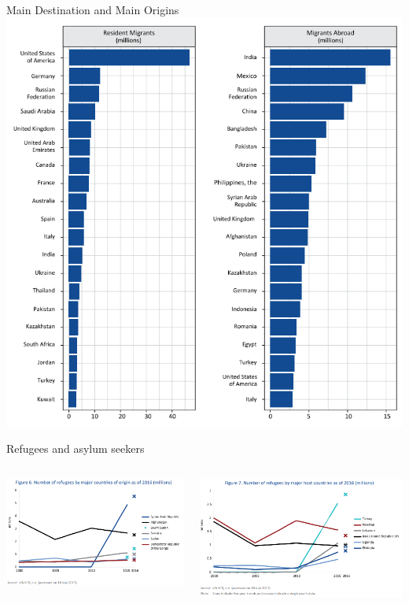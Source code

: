 \documentclass[10pt,hyperref={CJKbookmarks=true},xcolor=dvipsnames,aspectratio=169]{beamer}
\begin{document}
\begin{frame}{Main Destination and Main Origins}
\centering \includegraphics[width=0.6\columnwidth]{fig/migration/mig4}
\end{frame}

\begin{frame}{Refugees and asylum seekers}
  \begin{columns}
  	\begin{column}{0.5\textwidth}
  	\includegraphics[width=\columnwidth]{fig/migration/mig5}
  \end{column}

  \begin{column}{0.5\textwidth}
  	\includegraphics[width=\columnwidth]{fig/migration/mig6}
  \end{column}
  \end{columns}

\end{frame}
\end{document}
